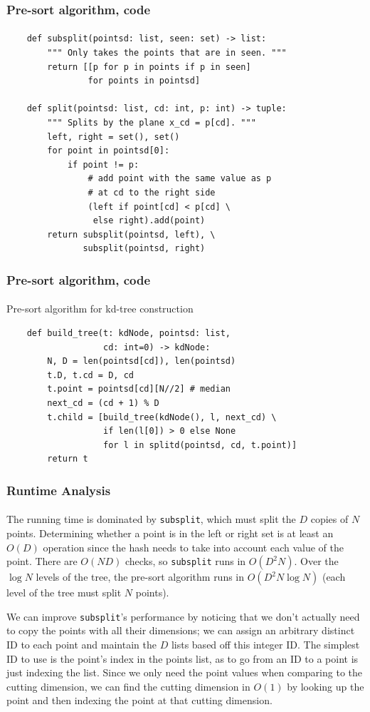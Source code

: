 \documentclass{beamer}                             %
\begin{document}
\begin{frame}[fragile]
\frametitle{Pre-sort algorithm, code}
\framesubtitle{}
\begin{verbatim}
    def subsplit(pointsd: list, seen: set) -> list:
        """ Only takes the points that are in seen. """
        return [[p for p in points if p in seen]
                for points in pointsd]

    def split(pointsd: list, cd: int, p: int) -> tuple:
        """ Splits by the plane x_cd = p[cd]. """
        left, right = set(), set()
        for point in pointsd[0]:
            if point != p:
                # add point with the same value as p
                # at cd to the right side
                (left if point[cd] < p[cd] \
                 else right).add(point)
        return subsplit(pointsd, left), \
               subsplit(pointsd, right)
\end{verbatim}
\end{frame}

\begin{frame}[fragile]
\frametitle{Pre-sort algorithm, code}
\framesubtitle{}
\begin{algorithm}[H]
  \caption{Pre-sort algorithm for kd-tree construction}
  \begin{verbatim}
    def build_tree(t: kdNode, pointsd: list,
                   cd: int=0) -> kdNode:
        N, D = len(pointsd[cd]), len(pointsd)
        t.D, t.cd = D, cd
        t.point = pointsd[cd][N//2] # median
        next_cd = (cd + 1) % D
        t.child = [build_tree(kdNode(), l, next_cd) \
                   if len(l[0]) > 0 else None
                   for l in splitd(pointsd, cd, t.point)]
        return t
  \end{verbatim}
\end{algorithm}
\end{frame}

\begin{frame}
\frametitle{Runtime Analysis}
\framesubtitle{}
The running time is dominated by \texttt{subsplit}, which must split the \( D \)
copies of \( N \) points. Determining whether a point is in the left or right
set is at least an \( O(D) \) operation since the hash needs to take into
account each value of the point. There are \( O(ND) \) checks,
so \texttt{subsplit} runs in \( O(D^2 N) \).
Over the \( \log N \) levels of the tree, the pre-sort algorithm runs in
\( O(D^2 N \log N) \) (each level of the tree must split \( N \) points). \pause

We can improve \texttt{subsplit}'s performance by noticing that we don't
actually need to copy the points with all their dimensions; we can assign
an arbitrary distinct ID to each point and maintain the \( D \) lists
based off this integer ID. The simplest ID to use is the point's index
in the points list, as to go from an ID to a point is just indexing the list.
Since we only need the point values when comparing to the cutting dimension,
we can find the cutting dimension in \( O(1) \) by looking up the point and then
indexing the point at that cutting dimension.
\end{frame}
\end{document}
